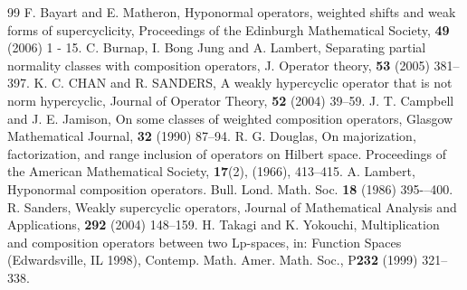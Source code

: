 \documentclass{amsart}
\theoremstyle{definition}\newtheorem{defn}[thm]{Definition}
\theoremstyle{remark}
\numberwithin{equation}{section}
\begin{document}
\begin{thebibliography}{99}
 F. Bayart and E. Matheron, Hyponormal operators, weighted shifts and weak forms of supercyclicity, Proceedings of the Edinburgh Mathematical Society, {\bf 49} (2006) 1 - 15.
 C. Burnap, I. Bong Jung and A. Lambert, Separating partial normality classes with composition operators, J. Operator theory, {\bf 53} (2005) 381--397.
 K. C. CHAN and R. SANDERS, A weakly hypercyclic operator that is not norm hypercyclic, Journal of Operator Theory, {\bf52} (2004) 39–59. 
 J. T. Campbell and J. E. Jamison, On some classes of weighted composition operators, Glasgow Mathematical Journal, {\bf32} (1990) 87--94.
R. G. Douglas, On majorization, factorization, and range inclusion of operators on Hilbert space. Proceedings of the American Mathematical Society, \textbf{17}(2), (1966), 413–415.
 A. Lambert, Hyponormal composition operators. Bull. Lond. Math. Soc. {\bf 18} (1986) 395-–400.
 R. Sanders, Weakly supercyclic operators, Journal of Mathematical Analysis and Applications, {\bf 292} (2004) 148--159.
 H. Takagi and K. Yokouchi, Multiplication and composition operators between two Lp-spaces, in: Function Spaces (Edwardsville, IL 1998), Contemp. Math. Amer. Math. Soc., P{\bf 232} (1999) 321–338.

\end{thebibliography}
\end{document}
